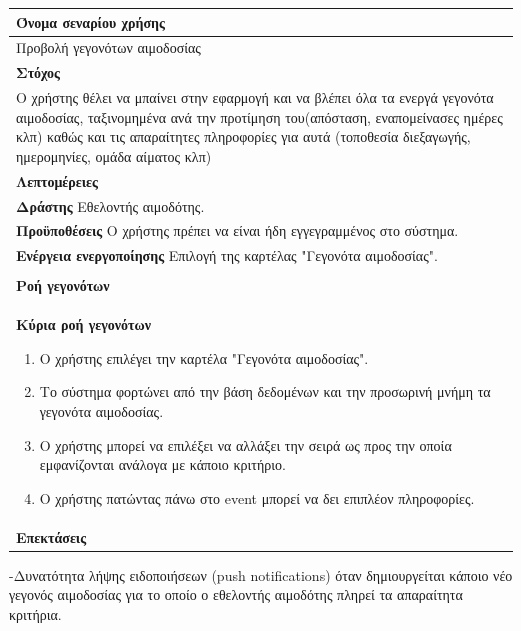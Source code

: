 	\begin{center}
    \begin{tabular}{|p{\dimexpr \linewidth-2\tabcolsep}|}
    \hline
    \rowcolor{grayy}
    \textbf{Όνομα σεναρίου χρήσης}
    \\ \hline    
    Προβολή γεγονότων αιμοδοσίας
     \\ \hline
    \rowcolor{grayy}
    \textbf{\textbf{Στόχος}}
    \\ \hline
 	Ο χρήστης θέλει να μπαίνει στην εφαρμογή και να βλέπει όλα τα ενεργά γεγονότα αιμοδοσίας, ταξινομημένα ανά την προτίμηση του(απόσταση, εναπομείνασες ημέρες κλπ) καθώς και τις απαραίτητες πληροφορίες για αυτά (τοποθεσία διεξαγωγής, ημερομηνίες, ομάδα αίματος κλπ)
    \\ \hline
    \rowcolor{grayy}
    \textbf{Λεπτομέρειες}
    \\ \hline
	\textbf{Δράστης} Εθελοντής αιμοδότης.
	\\*
	\textbf{Προϋποθέσεις} Ο χρήστης πρέπει να είναι ήδη εγγεγραμμένος στο σύστημα.
	\\*
	\textbf{Ενέργεια ενεργοποίησης} Επιλογή της καρτέλας "Γεγονότα αιμοδοσίας".
	\\ \hline
    \\ \hline
	\rowcolor{grayy}    
    \textbf{Ροή γεγονότων}
    \\* 
	\textbf{Κύρια ροή γεγονότων}
	\begin{enumerate}
	\item	Ο χρήστης επιλέγει την καρτέλα "Γεγονότα αιμοδοσίας".
	\item Το σύστημα φορτώνει από την βάση δεδομένων και την προσωρινή μνήμη τα γεγονότα αιμοδοσίας.
	\item Ο χρήστης μπορεί να επιλέξει να αλλάξει την σειρά ως προς την οποία εμφανίζονται ανάλογα με κάποιο κριτήριο.
	\item Ο χρήστης πατώντας πάνω στο event μπορεί να δει επιπλέον πληροφορίες.
	\end{enumerate}
	\\*
	\textbf{Επεκτάσεις}
	   \\ \hline
    \end{tabular}
\end{center}

-Δυνατότητα λήψης ειδοποιήσεων (push notifications) όταν δημιουργείται κάποιο νέο γεγονός αιμοδοσίας για το οποίο ο εθελοντής αιμοδότης πληρεί τα απαραίτητα κριτήρια.

